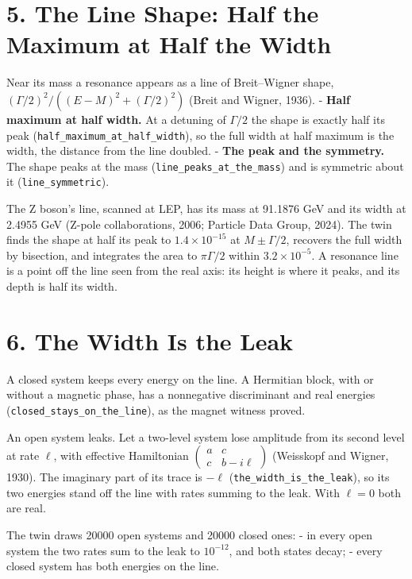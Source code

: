 \documentclass[10pt]{article}
\begin{document}
\hypertarget{the-line-shape-half-the-maximum-at-half-the-width}{%
\section{5. The Line Shape: Half the Maximum at Half the
Width}\label{the-line-shape-half-the-maximum-at-half-the-width}}

Near its mass a resonance appears as a line of Breit--Wigner shape,
\((\Gamma/2)^2/((E-M)^2+(\Gamma/2)^2)\) (Breit and Wigner, 1936). -
\textbf{Half maximum at half width.} At a detuning of \(\Gamma/2\) the
shape is exactly half its peak
(\texttt{half\_maximum\_at\_half\_width}), so the full width at half
maximum is the width, the distance from the line doubled. - \textbf{The
peak and the symmetry.} The shape peaks at the mass
(\texttt{line\_peaks\_at\_the\_mass}) and is symmetric about it
(\texttt{line\_symmetric}).

The Z boson's line, scanned at LEP, has its mass at 91.1876 GeV and its
width at 2.4955 GeV (Z-pole collaborations, 2006; Particle Data Group,
2024). The twin finds the shape at half its peak to
\(1.4\times10^{-15}\) at \(M\pm\Gamma/2\), recovers the full width by
bisection, and integrates the area to \(\pi\Gamma/2\) within
\(3.2\times10^{-5}\). A resonance line is a point off the line seen from
the real axis: its height is where it peaks, and its depth is half its
width.

\hypertarget{the-width-is-the-leak}{%
\section{6. The Width Is the Leak}\label{the-width-is-the-leak}}

A closed system keeps every energy on the line. A Hermitian block, with
or without a magnetic phase, has a nonnegative discriminant and real
energies (\texttt{closed\_stays\_on\_the\_line}), as the magnet witness
proved.

An open system leaks. Let a two-level system lose amplitude from its
second level at rate \(\ell\), with effective Hamiltonian
\(\begin{pmatrix}a&c\\c&b-i\ell\end{pmatrix}\) (Weisskopf and Wigner,
1930). The imaginary part of its trace is \(-\ell\)
(\texttt{the\_width\_is\_the\_leak}), so its two energies stand off the
line with rates summing to the leak. With \(\ell=0\) both are real.

The twin draws 20000 open systems and 20000 closed ones: - in every open
system the two rates sum to the leak to \(10^{-12}\), and both states
decay; - every closed system has both energies on the line.
\end{document}

